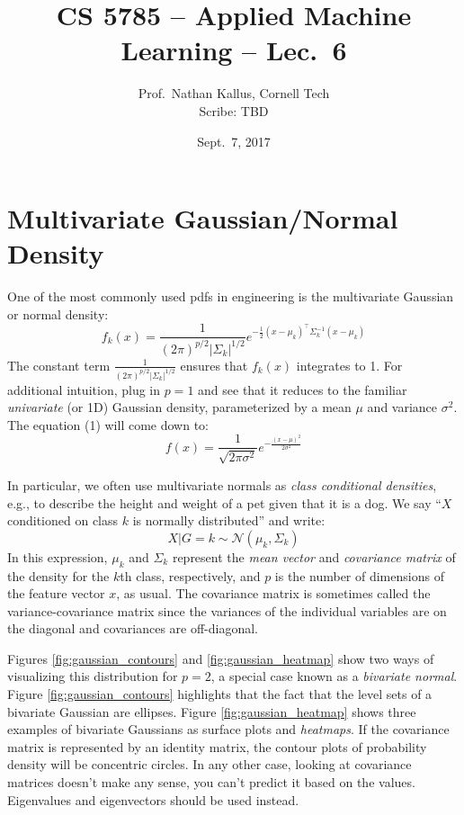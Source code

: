 \documentclass[a4paper]{article}
\title{CS 5785 -- Applied Machine Learning -- Lec.\ 6}
\author{Prof.\ Nathan Kallus, Cornell Tech\\Scribe: TBD}
\date{Sept.\ 7, 2017}
\begin{document}
\maketitle


\section{Multivariate Gaussian/Normal Density}
One of the most commonly used pdfs in engineering is the multivariate Gaussian or normal density:
\begin{equation}
f_k(x)=\frac{1}{(2\pi)^{p/2}|\Sigma_k|^{1/2}}e^{-\frac{1}{2}(x-\mu_k)^\top\Sigma_k^{-1}(x-\mu_k)}
\label{eqn:mvgaussian}
\end{equation}
 The constant term $\frac{1}{(2\pi)^{p/2}|\Sigma_k|^{1/2}}$ ensures that $f_k(x)$ integrates to 1.  For additional intuition, plug in $p=1$  and see that it reduces to the familiar \emph{univariate} (or 1D) Gaussian density, parameterized by a mean $\mu$ and variance $\sigma^2$.  The equation (1) will come down to:
\begin{equation}
f(x) = \frac{1}{\sqrt{2\pi\sigma^2}}e^{-\frac{(x-\mu)^2}{2\sigma^2}}
\end{equation}

In particular, we often use multivariate normals as \emph{class conditional densities}, e.g., to describe the height and weight of a pet given that it is a dog.  We say ``$X$ conditioned on class $k$ is normally distributed'' and write:
\begin{equation}
X|G=k\sim{\mathcal N}(\mu_k,\Sigma_k)
\end{equation}
In this expression, $\mu_k$ and $\Sigma_k$ represent the \emph{mean vector} and \emph{covariance matrix} of the density for the $k$th class, respectively, and $p$ is the number of dimensions of the feature vector $x$, as usual. The covariance matrix is sometimes called the variance-covariance matrix since the variances of the individual variables are on the diagonal and covariances are off-diagonal.

Figures \ref{fig:gaussian_contours} and \ref{fig:gaussian_heatmap} show two ways of visualizing this distribution for $p=2$, a special case known as a \emph{bivariate normal}.  Figure \ref{fig:gaussian_contours} highlights that the fact that the level sets of a bivariate Gaussian are ellipses.  Figure \ref{fig:gaussian_heatmap} shows three examples of bivariate Gaussians as surface plots and \emph{heatmaps}.  If the covariance matrix is represented by an identity matrix, the contour plots of probability density will be concentric circles. In any other case, looking at covariance matrices doesn't make  any sense, you can't predict it based on the values. Eigenvalues and eigenvectors should be used instead.
\end{document}
